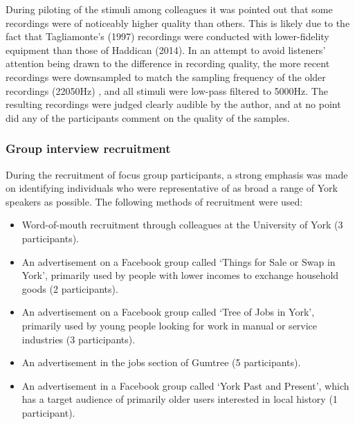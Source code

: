\documentclass{article}
\begin{document}
During piloting of the stimuli among colleagues it was pointed out that some recordings were of noticeably higher quality than others. This is likely due to the fact that Tagliamonte's (1997) recordings were conducted with lower-fidelity equipment than those of Haddican (2014). In an attempt to avoid listeners' attention being drawn to the difference in recording quality, the more recent recordings were downsampled to match the sampling frequency of the older recordings (22050Hz) , and all stimuli were low-pass filtered to 5000Hz. The resulting recordings were judged clearly audible by the author, and at no point did any of the participants comment on the quality of the samples.


\newpage
\subsubsection*{Group interview recruitment}

During the recruitment of focus group participants, a strong emphasis was made on identifying individuals who were representative of as broad a range of York speakers as possible. The following methods of recruitment were used:

\begin{itemize}
\item{Word-of-mouth recruitment through colleagues at the University of York (3 participants).}
\item{An advertisement on a Facebook group called `Things for Sale or Swap in York', primarily used by people with lower incomes to exchange household goods (2 participants).}
\item{An advertisement on a Facebook group called `Tree of Jobs in York', primarily used by young people looking for work in manual or service industries (3 participants).}
\item{An advertisement in the jobs section of Gumtree (5 participants).}
\item{An advertisement in a Facebook group called `York Past and Present', which has a target audience of primarily older users interested in local history (1 participant).}
\end{itemize}
\end{document}
